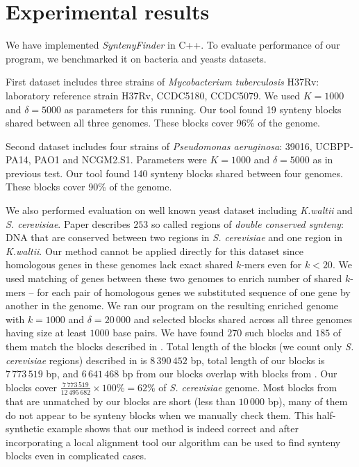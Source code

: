 \documentclass[a4paper, 12pt]{scrartcl}
\begin{document}
\section{Experimental results}
We have implemented \textit{SyntenyFinder} in C++. To evaluate performance of our program, we benchmarked it on bacteria and yeasts datasets.

First dataset includes three strains of \textit{Mycobacterium tuberculosis} H37Rv: laboratory reference strain H37Rv,
CCDC5180, CCDC5079. We used \(K = 1000\) and \(\delta = 5000\) as parameters for this running. Our tool found
19 synteny blocks shared between all three genomes. These blocks cover 96\% of the genome.

Second dataset includes four strains of \textit{Pseudomonas aeruginosa}: 39016, UCBPP-PA14, PAO1 and NCGM2.S1.
Parameters were \(K = 1000\) and \(\delta = 5000\) as in previous test. Our tool found 140 synteny blocks shared between four genomes. 
These blocks cover 90\% of the genome.

We also performed evaluation on well known yeast dataset including \textit{K.waltii} and \textit{S. cerevisiae}. Paper \cite{Kellis2004} describes
\(253\) so called regions of \textit{double conserved synteny}: DNA that are conserved between two regions in \textit{S. cerevisiae} and one region in \textit{K.waltii}.
Our method cannot be applied directly for this dataset since homologous genes in these genomes lack exact shared \(k\)-mers even for \(k < 20\). We used
matching of genes between these two genomes to enrich number of shared \(k\)-mers -- for each pair of homologous genes we substituted sequence of one
gene by another in the genome. We ran our program on the resulting enriched genome with \(k = 1000\) and \(\delta = 20 \,000\) and selected blocks shared
across all three genomes having size at least \(1 000\) base pairs. We have found \(270\) such blocks and \(185\) of them match the blocks described in \cite{Kellis2004}.
Total length of the blocks (we count only \textit{S. cerevisiae} regions) described in \cite{Kellis2004} is \(8  \, 390  \, 452\) bp, total length of our blocks is \(7 \, 773 \, 519\) bp, and \(6 \, 641 \, 468\) bp
from our blocks overlap with blocks from \cite{Kellis2004}. Our blocks cover  \(\frac{7 \, 773 \, 519}{12 \, 495 \, 682} \times 100 \% = 62\% \) of \textit{S. cerevisiae} genome. Most
blocks from \cite{Kellis2004} that are unmatched by our blocks are short (less than \(10 \, 000\) bp), many of them do not appear to be
synteny blocks when we manually check them. This half-synthetic example shows that
our method is indeed correct and after incorporating a local alignment tool our algorithm can be used to find synteny blocks even in complicated cases.
\end{document}

